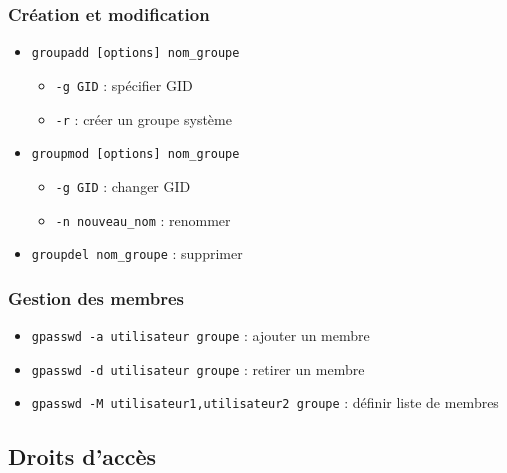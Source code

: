 \documentclass[12pt,a4paper]{article}
\begin{document}
\subsubsection{Cr\'eation et modification}
\begin{itemize}
    \item \texttt{groupadd [options] nom\_groupe}
    \begin{itemize}
        \item \texttt{-g GID} : sp\'ecifier GID
        \item \texttt{-r} : cr\'eer un groupe syst\`eme
    \end{itemize}
    \item \texttt{groupmod [options] nom\_groupe}
    \begin{itemize}
        \item \texttt{-g GID} : changer GID
        \item \texttt{-n nouveau\_nom} : renommer
    \end{itemize}
    \item \texttt{groupdel nom\_groupe} : supprimer
\end{itemize}

\subsubsection{Gestion des membres}
\begin{itemize}
    \item \texttt{gpasswd -a utilisateur groupe} : ajouter un membre
    \item \texttt{gpasswd -d utilisateur groupe} : retirer un membre
    \item \texttt{gpasswd -M utilisateur1,utilisateur2 groupe} : d\'efinir liste de membres
\end{itemize}


\subsection{Droits d'acc\`es}

\end{document}

